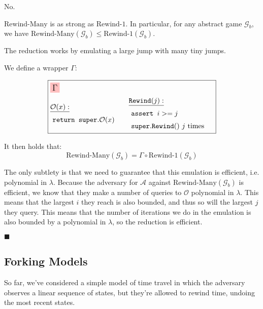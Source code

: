 No.

\begin{claim}
    \label{claim:rewind-many-is-not-strong}
    $\text{Rewind-Many}$ is as strong as $\text{Rewind-1}$.
    In particular, for any abstract game $\mathcal{G}_b$, we have
    $\text{Rewind-Many}(\mathcal{G}_b) \leq \text{Rewind-1}(\mathcal{G}_b)$.
\end{claim}

The reduction works by emulating a large jump with many tiny jumps.

We define a wrapper $\Gamma$:

$$
\boxed{
\begin{aligned}
&\colorbox{pink}{\large $\Gamma$}\cr
&\begin{aligned}
    &\underline{\mathcal{O}(x):}\cr
    &\ \texttt{return } \texttt{super}.\mathcal{O}(x)\cr
\end{aligned}
&\begin{aligned}
    &\underline{\texttt{Rewind}(j):}\cr
    &\ \texttt{assert } i >= j\cr
    &\ \texttt{super}.\texttt{Rewind}()\ j \text{ times }\cr
\end{aligned}\cr
\end{aligned}
}
$$

It then holds that:
$$
\text{Rewind-Many}(\mathcal{G}_b) = \Gamma \circ \text{Rewind-1}(\mathcal{G}_b)
$$

The only subtlety is that we need to guarantee that this emulation
is efficient, i.e. polynomial in $\lambda$.
Because the adversary for $\mathcal{A}$ against $\text{Rewind-Many}(\mathcal{G}_b)$
is efficient, we know that they make a number of queries to $\mathcal{O}$ polynomial
in $\lambda$.
This means that the largest $i$ they reach is also bounded, and thus so will the largest
$j$ they query.
This means that the number of iterations we do in the emulation is also bounded by a polynomial
in $\lambda$, so the reduction is efficient.

$\blacksquare$

\subsection{Forking Models}

So far, we've considered a simple model of time travel in which the
adversary observes a linear sequence of states, but they're allowed to
rewind time, undoing the most recent states.

\begin{figure}[H]
\centering
{}
\end{figure}


